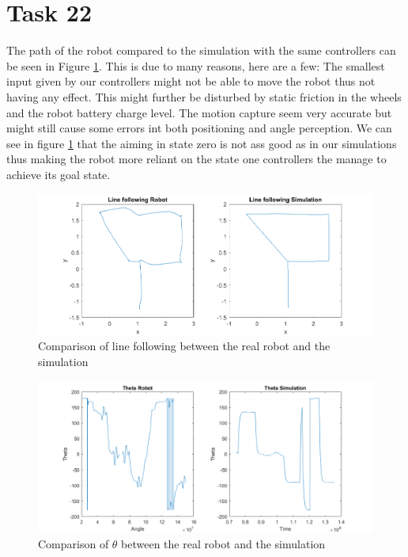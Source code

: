 \documentclass[a4paper,12pt,oneside,onecolumn]{article} %
\begin{document}
\section*{Task 22}

The path of the robot compared to the simulation with the same controllers can be seen in Figure \ref{compare}. This is due to many reasons, here are a few: The smallest input given by our controllers might not be able to move the robot thus not having any effect. This might further be disturbed by static friction in the wheels and the robot battery charge level. The motion capture seem very accurate but might still cause some errors int both positioning and angle perception. We can see in figure \ref{compare} that the aiming in state zero is not ass good as in our simulations thus making the robot more reliant on the state one controllers the manage to achieve its goal state. 

\begin{figure}[H]
	\begin{center}
	\includegraphics[scale=0.5]{task22.png}
	\caption{Comparison of line following between the real robot and the simulation}
	\label{compare}
	\end{center}
\end{figure}


\begin{figure}[H]
	\begin{center}
	\includegraphics[scale=0.5]{task22angle.png}
	\caption{Comparison of  $\theta$ between the real robot and the simulation}
	\label{compareangle}
	\end{center}
\end{figure}




\end{document}
